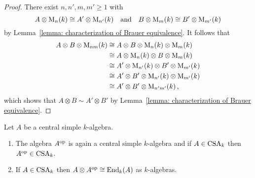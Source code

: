 \begin{proof}
  There exist $n, n', m, m' \geq 1$ with
  \[
          A \otimes \operatorname{M}_n(k)
    \cong A' \otimes \operatorname{M}_{n'}(k)
    \quad\text{and}\quad
          B \otimes \operatorname{M}_m(k)
    \cong B'  \otimes \operatorname{M}_{m'}(k)
  \]
  by Lemma~\ref{lemma: characterization of Brauer equivalence}.
  It follows that
  \begin{align*}
            A \otimes B \otimes \operatorname{M}_{nm}(k)
    &\cong  A \otimes B \otimes \operatorname{M}_{n}(k) \otimes \operatorname{M}_{m}(k) \\
    &\cong  A \otimes \operatorname{M}_{n}(k) \otimes B \otimes \operatorname{M}_{m}(k) \\
    &\cong  A' \otimes \operatorname{M}_{n'}(k) \otimes B' \otimes \operatorname{M}_{m'}(k) \\
    &\cong  A' \otimes B' \otimes \operatorname{M}_{n'}(k) \otimes \operatorname{M}_{m'}(k) \\
    &\cong  A' \otimes B' \otimes \operatorname{M}_{n'm'}(k) \,,
  \end{align*}
  which shows that $A \otimes B \sim A' \otimes B'$ by Lemma~\ref{lemma: characterization of Brauer equivalence}.
\end{proof}


\begin{lemma}
  Let $A$ be a central simple $k$-algebra.
  \begin{enumerate}
    \item
      The algebra $A^{\mathrm{op}}$ is again a central simple $k$-algebra and if $A \in \operatorname{CSA}_k$ then $A^{\mathrm{op}} \in \operatorname{CSA}_k$.
    \item
      If $A \in \operatorname{CSA}_k$ then $A \otimes A^{\mathrm{op}} \cong \operatorname{End}_k(A)$ as $k$-algebras.
  \end{enumerate}
\end{lemma}


